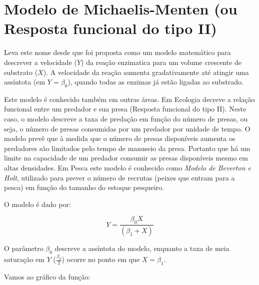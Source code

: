 \documentclass[
]{book}
\begin{document}
\hypertarget{modelo-de-michaelis-menten-ou-resposta-funcional-do-tipo-ii}{%
\section{Modelo de Michaelis-Menten (ou Resposta funcional do tipo II)}\label{modelo-de-michaelis-menten-ou-resposta-funcional-do-tipo-ii}}

Leva este nome desde que foi proposta como um modelo matemático para descrever a velocidade (\(Y\)) da reação enzimatica para um volume crescente de substrato (\(X\)). A velocidade da reação aumenta gradativamente até atingir uma assíntota (em \(Y = \beta_0\)), quando todas as enzimas já estão ligadas ao substrado.

Este modelo é conhecido também em outras áreas. Em Ecologia decreve a relação funcional entre um predador e sua presa (Resposta funcional do tipo II). Neste caso, o modelo descreve a taxa de predação em função do número de presas, ou seja, o número de presas consumidas por um predador por unidade de tempo. O modelo prevê que à medida que o número de presas disponíveis aumenta os predadores são limitados pelo tempo de manuseio da presa. Portanto que há um limite na capacidade de um predador consumir as presas disponíveis mesmo em altas densidades. Em Pesca este modelo é conhecido como \emph{Modelo de Beverton e Holt}, utilizado para prever o número de recrutas (peixes que entram para a pesca) em função do tamanho do estoque pesqueiro.

O modelo é dado por:

\[Y = \frac{\beta_0 X}{(\beta_1 + X)}\]

O parâmetro \(\beta_0\) descreve a assíntota do modelo, enquanto a taxa de meia saturação em \(Y\) (\(\frac{\beta_0}{2}\)) ocorre no ponto em que \(X = \beta_1\).

Vamos ao gráfico da função:
\end{document}
